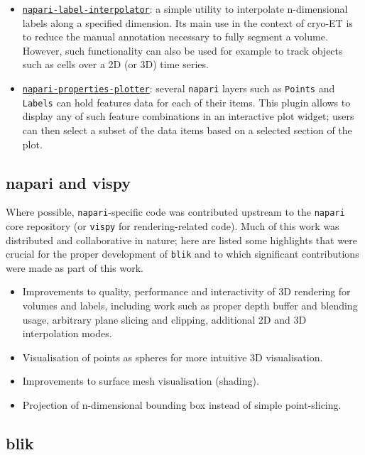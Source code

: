\begin{itemize}[noitemsep] 
    \item \href{https://github.com/brisvag/napari-label-interpolator/}{\texttt{napari-label-interpolator}}: a simple utility to interpolate n-dimensional labels along a specified dimension. Its main use in the context of cryo-ET is to reduce the manual annotation necessary to fully segment a volume. However, such functionality can also be used for example to track objects such as cells over a 2D (or 3D) time series. 
    \item \href{https://github.com/brisvag/napari-properties-plotter/}{\texttt{napari-properties-plotter}}: several \texttt{napari} layers such as \texttt{Points} and \texttt{Labels} can hold features data for each of their items. This plugin allows to display any of such feature combinations in an interactive plot widget; users can then select a subset of the data items based on a selected section of the plot.
\end{itemize}

\subsection{napari and vispy}\label{napari-and-vispy}

Where possible, \texttt{napari}-specific code was contributed upstream to the \texttt{napari} core repository (or \texttt{vispy} for rendering-related code). Much of this work was distributed and collaborative in nature; here are listed some highlights that were crucial for the proper development of \texttt{blik} and to which significant contributions were made as part of this work.

\begin{itemize}[noitemsep] 
    \item Improvements to quality, performance and interactivity of 3D rendering for volumes and labels, including work such as proper depth buffer and blending usage, arbitrary plane slicing and clipping, additional 2D and 3D interpolation modes. 
    \item Visualisation of points as spheres for more intuitive 3D visualisation.
    \item Improvements to surface mesh visualisation (shading).
    \item Projection of n-dimensional bounding box instead of simple point-slicing.
\end{itemize}

\subsection{blik}\label{blik}

